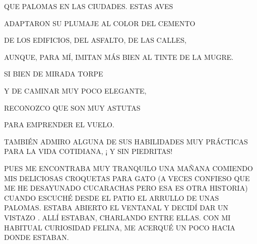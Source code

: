 \documentclass[20pt,oneside,openright,extrafontsizes,landscape,a5paper]{memoir}
\begin{document}
			 QUE  PALOMAS EN LAS CIUDADES. ESTAS AVES			
						
			ADAPTARON SU PLUMAJE  AL COLOR 	DEL CEMENTO 
			
			DE LOS EDIFICIOS,  DEL ASFALTO, DE LAS CALLES, 
			
			AUNQUE, PARA MÍ, IMITAN MÁS BIEN AL TINTE DE LA MUGRE.	

\newpage
{}
SI BIEN DE MIRADA TORPE 

Y DE CAMINAR MUY POCO ELEGANTE, 
			\newline\newline\newline
			
			RECONOZCO QUE SON MUY ASTUTAS
			
			 PARA EMPRENDER EL VUELO.
				\newline\newline
			\begin{flushright}
				\begin{minipage}[r]{.5\textwidth}
	TAMBIÉN ADMIRO ALGUNA DE SUS HABILIDADES MUY PRÁCTICAS PARA LA VIDA COTIDIANA, ¡ Y SIN PIEDRITAS!
\end{minipage}
			\end{flushright}	

	
	
	
	


\newpage
{}	
	PUES ME ENCONTRABA MUY TRANQUILO UNA MAÑANA COMIENDO MIS DELICIOSAS CROQUETAS PARA GATO (A VECES CONFIESO QUE ME HE DESAYUNADO CUCARACHAS PERO ESA ES OTRA HISTORIA) 
			\newline\newline\newline
						\newline\newline\newline	\newline\newline 
			CUANDO ESCUCHÉ DESDE EL PATIO EL ARRULLO DE UNAS PALOMAS.
			ESTABA ABIERTO EL VENTANAL Y DECIDÍ DAR UN VISTAZO . ALLÍ ESTABAN, CHARLANDO ENTRE ELLAS. CON MI HABITUAL CURIOSIDAD FELINA, ME ACERQUÉ UN POCO HACIA DONDE ESTABAN.
		
\end{document}
